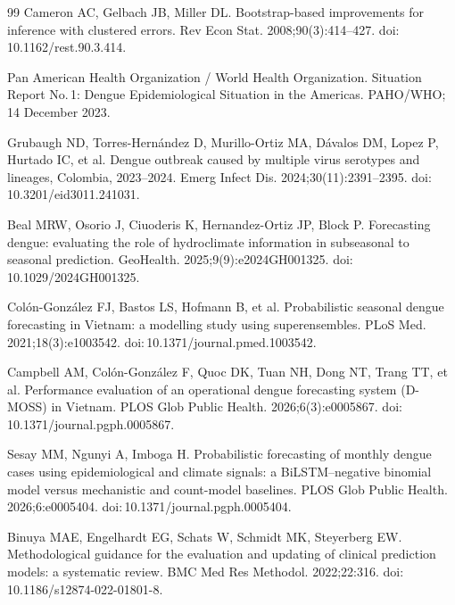 \documentclass[11pt,a4paper]{article}
\begin{document}
\begin{thebibliography}{99}
 Cameron AC, Gelbach JB, Miller DL. Bootstrap-based improvements for inference with clustered errors. Rev Econ Stat. 2008;90(3):414--427. doi:\,10.1162/rest.90.3.414.

 Pan American Health Organization / World Health Organization. Situation Report No.\,1: Dengue Epidemiological Situation in the Americas. PAHO/WHO; 14 December 2023.

 Grubaugh ND, Torres-Hern\'andez D, Murillo-Ortiz MA, D\'avalos DM, Lopez P, Hurtado IC, et al. Dengue outbreak caused by multiple virus serotypes and lineages, Colombia, 2023--2024. Emerg Infect Dis. 2024;30(11):2391--2395. doi:\,10.3201/eid3011.241031.

 Beal MRW, Osorio J, Ciuoderis K, Hernandez-Ortiz JP, Block P. Forecasting dengue: evaluating the role of hydroclimate information in subseasonal to seasonal prediction. GeoHealth. 2025;9(9):e2024GH001325. doi:\,10.1029/2024GH001325.

 Col\'{o}n-Gonz\'{a}lez FJ, Bastos LS, Hofmann B, et al. Probabilistic seasonal dengue forecasting in Vietnam: a modelling study using superensembles. PLoS Med. 2021;18(3):e1003542. doi:\,10.1371/journal.pmed.1003542.

 Campbell AM, Col\'on-Gonz\'alez F, Quoc DK, Tuan NH, Dong NT, Trang TT, et al. Performance evaluation of an operational dengue forecasting system (D-MOSS) in Vietnam. PLOS Glob Public Health. 2026;6(3):e0005867. doi:\,10.1371/journal.pgph.0005867.

 Sesay MM, Ngunyi A, Imboga H. Probabilistic forecasting of monthly dengue cases using epidemiological and climate signals: a BiLSTM--negative binomial model versus mechanistic and count-model baselines. PLOS Glob Public Health. 2026;6:e0005404. doi:\,10.1371/journal.pgph.0005404.

 Binuya MAE, Engelhardt EG, Schats W, Schmidt MK, Steyerberg EW. Methodological guidance for the evaluation and updating of clinical prediction models: a systematic review. BMC Med Res Methodol. 2022;22:316. doi:\,10.1186/s12874-022-01801-8.

\end{thebibliography}
\endgroup

\clearpage
\end{document}
